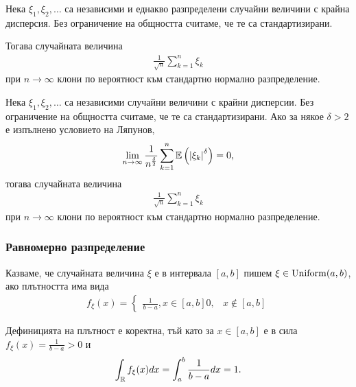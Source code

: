 \documentclass[numbers=endperiod, bibliography=totocnumbered]{scrartcl}
\begin{document}
\begin{theorem}
  Нека \( \xi_1, \xi_2, \ldots \) са независими и еднакво разпределени случайни величини с крайна дисперсия. Без ограничение на общността считаме, че те са стандартизирани.

  Тогава случайната величина
  \begin{align*}
    \frac 1 {\sqrt n} \sum_{k=1}^n \xi_k
  \end{align*}
  при \( n \to \infty \) клони по вероятност към стандартно нормално разпределение.
\end{theorem}

\begin{theorem}
  Нека \( \xi_1, \xi_2, \ldots \) са независими случайни величини с крайни дисперсии. Без ограничение на общността считаме, че те са стандартизирани.
  Ако за някое \( \delta > 2 \) е изпълнено условието на Ляпунов,
  \begin{align*}
    \lim_{n \to \infty} \frac 1 {n^{\frac \delta 2}} \sum_{k=1}^n \mathbb{E} \left( {\left\vert \xi_k \right\vert}^\delta \right) = 0,
  \end{align*}
  тогава случайната величина
  \begin{align*}
    \frac 1 {\sqrt n} \sum_{k=1}^n \xi_k
  \end{align*}
  при \( n \to \infty \) клони по вероятност към стандартно нормално разпределение.
\end{theorem}

\subsubsection{Равномерно разпределение}\label{dist:unif}

\begin{definition}
  Казваме, че случайната величина \( \xi \) е  в интервала \( [a, b] \) пишем \( \xi \in \operatorname{Uniform}(a, b) \), ако плътността има вида
  \begin{align*}
    f_\xi(x)
    =
    \begin{cases}
      \frac 1 {b-a}, x \in [a, b]
      0, & x \not\in [a, b]
    \end{cases}
  \end{align*}

  Дефиницията на плътност е коректна, тъй като за \( x \in [a, b] \) е в сила \( f_\xi(x) = \frac 1 {b-a} > 0 \) и
  \begin{align*}
    \int_{\mathbb{R}} f_\xi(x) dx
    =
    \int_a^b \frac 1 {b-a} dx
    =
    1.
  \end{align*}
\end{definition}
\end{document}
